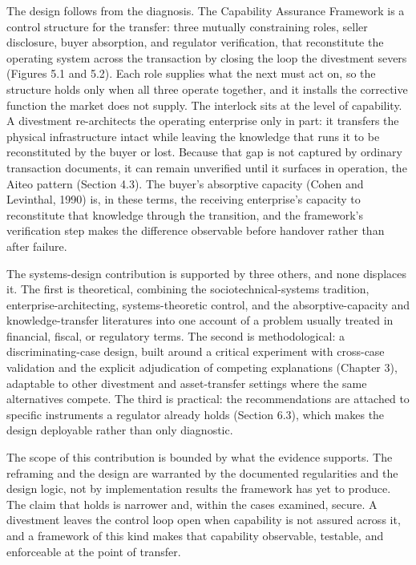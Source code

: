 \documentclass[twoside,fontset=lmodern]{mitthesis}
\begin{document}
The design follows from the diagnosis. The Capability Assurance
Framework is a control structure for the transfer: three mutually
constraining roles, seller disclosure, buyer absorption, and regulator
verification, that reconstitute the operating system across the
transaction by closing the loop the divestment severs (Figures 5.1 and
5.2). Each role supplies what the next must act on, so the structure
holds only when all three operate together, and it installs the
corrective function the market does not supply. The interlock sits at
the level of capability. A divestment re-architects the operating
enterprise only in part: it transfers the physical infrastructure intact
while leaving the knowledge that runs it to be reconstituted by the
buyer or lost. Because that gap is not captured by ordinary transaction
documents, it can remain unverified until it surfaces in operation, the
Aiteo pattern (Section 4.3). The buyer's absorptive capacity (Cohen and
Levinthal, 1990) is, in these terms, the receiving enterprise's capacity
to reconstitute that knowledge through the transition, and the
framework's verification step makes the difference observable before
handover rather than after failure.

The systems-design contribution is supported by three others, and none
displaces it. The first is theoretical, combining the
sociotechnical-systems tradition, enterprise-architecting,
systems-theoretic control, and the absorptive-capacity and
knowledge-transfer literatures into one account of a problem usually
treated in financial, fiscal, or regulatory terms. The second is
methodological: a discriminating-case design, built around a critical
experiment with cross-case validation and the explicit adjudication of
competing explanations (Chapter 3), adaptable to other divestment and
asset-transfer settings where the same alternatives compete. The third
is practical: the recommendations are attached to specific instruments a
regulator already holds (Section 6.3), which makes the design deployable
rather than only diagnostic.

The scope of this contribution is bounded by what the evidence supports.
The reframing and the design are warranted by the documented
regularities and the design logic, not by implementation results the
framework has yet to produce. The claim that holds is narrower and,
within the cases examined, secure. A divestment leaves the control loop
open when capability is not assured across it, and a framework of this
kind makes that capability observable, testable, and enforceable at the
point of transfer.
\end{document}
